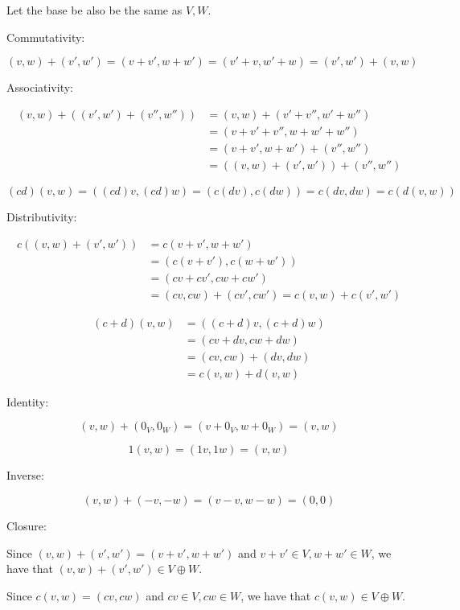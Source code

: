 \documentclass[12pt,letterpaper]{article}
\theoremstyle{definition}
\begin{document}
Let the base be also be the same as $V, W$.

Commutativity:

\[
  (v, w) + (v', w') = (v + v', w + w') = (v' + v, w' + w) = (v', w') + (v, w)
\]

Associativity:

\begin{align*}
  (v, w) + ((v', w') + (v'', w'')) &= (v, w) + (v' + v'', w' + w'') \\
                                   &= (v + v' + v'', w + w' + w'') \\
                                   &= (v + v', w + w') + (v'', w'') \\
                                   &= ((v, w) + (v', w')) + (v'', w'')
\end{align*}

\[
  (cd)(v, w) = ((cd)v, (cd)w) = (c(dv), c(dw)) = c(dv, dw) = c(d(v, w))
\]

Distributivity:

\begin{align*}
  c((v, w) + (v', w')) &= c(v + v', w + w') \\
                       &= (c(v + v'), c(w + w')) \\
                       &= (cv + cv', cw + cw') \\
                       &= (cv, cw) + (cv', cw') = c(v, w) + c(v', w')
\end{align*}

\begin{align*}
  (c + d)(v, w) &= ((c + d)v, (c + d)w) \\
                &= (cv + dv, cw + dw) \\
                &= (cv, cw) + (dv, dw) \\
                &= c(v, w) + d(v, w)
\end{align*}

Identity:

\[
  (v, w) + (0_V, 0_W) = (v + 0_V, w + 0_W) = (v, w)
\]

\[
  1(v, w) = (1v, 1w) = (v, w)
\]

Inverse:

\[
  (v, w) + (-v, -w) = (v - v, w - w) = (0, 0)
\]

Closure:

Since $(v, w) + (v', w') = (v + v', w + w')$ and $v + v' \in V, w + w' \in W$,
we have that $(v, w) + (v', w') \in V \oplus W$.

Since $c(v, w) = (cv, cw)$ and $cv \in V, cw \in W$, we have that $c(v, w) \in V
\oplus W$.
\end{document}
